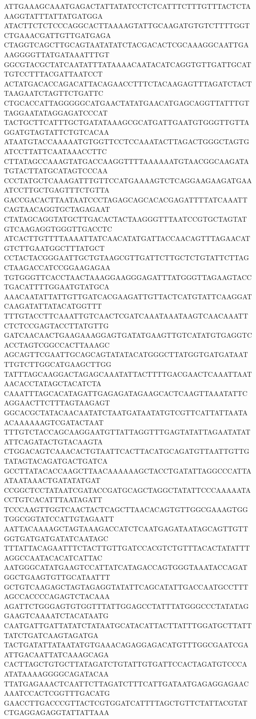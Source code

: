 ATTGAAAGCAAATGAGACTATTATATCCTCTCATTTCTTTGTTTACTCTAAAGGTATTTATTATGATGGA
ATACTTCTCTCCCAGGCACTTAAAAGTATTGCAAGATGTGTCTTTTGGTCTGAAACGATTGTTGATGAGA
CTAGGTCAGCTTGCAGTAATATATCTACGACACTCGCAAAGGCAATTGAAAGGGGTTATGATAAATTTGT
GGCGTACGCTATCAATATTTATAAAACAATACATCAGGTGTTGATTGCATTGTCCTTTACGATTAATCCT
ACTATGACACCAGACATTACAGAACCTTTCTACAAGAGTTTAGATCTACTTAAGAATCTAGTTCTGATTC
CTGCACCATTAGGGGGCATGAACTATATGAACATGAGCAGGTTATTTGTTAGGAATATAGGAGATCCCAT
TACTGCTTCATTTGCTGATATAAAGCGCATGATTGAATGTGGGTTGTTAGGATGTAGTATTCTGTCACAA
ATAATGTACCAAAAATGTGGTTCCTCCAAATACTTAGACTGGGCTAGTGATCCTTATTCAATAAACCTTC
CTTATAGCCAAAGTATGACCAAGGTTTTAAAAAATGTAACGGCAAGATATGTACTTATGCATAGTCCCAA
CCCTATGCTCAAAGATTTGTTCCATGAAAAGTCTCAGGAAGAAGATGAAATCCTTGCTGAGTTTCTGTTA
GACCGACACTTAATAATCCCTAGAGCAGCACACGAGATTTTATCAAATTCAGTAACAGGTGCTAGAGAAT
CTATAGCAGGTATGCTTGACACTACTAAGGGTTTAATCCGTGCTAGTATGTCAAGAGGTGGGTTGACCTC
ATCACTTGTTTTAAAATTATCAACATATGATTACCAACAGTTTAGAACATGTCTTGAATGGCTTTATGCT
CCTACTACGGGAATTGCTGTAAGCGTTGATTCTTGCTCTGTATTCTTAGCTAAGACCATCCGGAAGAGAA
TGTGGGTTCACCTAACTAAAGGAAGGGAGATTTATGGGTTAGAAGTACCTGACATTTTGGAATGTATGCA
AAACAATATTATTGTTGATCACGAAGATTGTTACTCATGTATTCAAGGATCAAGATATTATACATGGTTT
TTTGTACCTTCAAATTGTCAACTCGATCAAATAAATAAGTCAACAAATTCTCTCCGAGTACCTTATGTTG
GATCAACAACTGAAGAAAGGAGTGATATGAAGTTGTCATATGTGAGGTCACCTAGTCGGCCACTTAAAGC
AGCAGTTCGAATTGCAGCAGTATATACATGGGCTTATGGTGATGATAATTTGTCTTGGCATGAAGCTTGG
TATTTAGCAAGGACTAGAGCAAATATTACTTTTGACGAACTCAAATTAATAACACCTATAGCTACATCTA
CAAATTTAGCACATAGATTGAGAGATAGAAGCACTCAAGTTAAATATTCAGGAACTTCTTTAGTAAGAGT
GGCACGCTATACAACAATATCTAATGATAATATGTCGTTCATTATTAATAACAAAAAAGTCGATACTAAT
TTTGTCTACCAGCAAGGAATGTTATTAGGTTTGAGTATATTAGAATATATATTCAGATACTGTACAAGTA
CTGGACAGTCAAACACTGTAATTCACTTACATGCAGATGTTAATTGTTGTATAGTACAGATGACTGATCA
GCCTTATACACCAAGCTTAACAAAAAAGCTACCTGATATTAGGCCCATTAATAATAAACTGATATATGAT
CCGGCTCCTATAATCGATACCGATGCAGCTAGGCTATATTCCCAAAAATACCTGTCACATTTAATAGATT
TCCCAAGTTGGTCAACTACTCAGCTTAACACAGTGTTGGCGAAAGTGGTGGCGGTATCCATTGTAGAATT
AATTACAAAAGCTAGTAAAGACCATCTCAATGAGATAATAGCAGTTGTTGGTGATGATGATATCAATAGC
TTTATTACAGAATTTCTACTTGTTGATCCACGTCTGTTTACACTATATTTAGGCCAATACACATCATTAC
AATGGGCATATGAAGTCCATTATCATAGACCAGTGGGTAAATACCAGATGGCTGAAGTGTTGCATAATTT
GCTGTCAAGAGCTAGTAGAGGTATATTCAGCATATTGACCAATGCCTTTAGCCACCCCAGAGTCTACAAA
AGATTCTGGGAGTGTGGTTTATTGGAGCCTATTTATGGGCCCTATATAGGAAGTCAAAATCTACATAATG
CAATGATTGATTATATCTATAATGCATACATTACTTATTTGGATGCTTATTTATCTGATCAAGTAGATGA
TACTGATATTATAATATGTGAAACAGAGGAGACATGTTTGGCGAATCGAATTGACAATTATCAAAGCAGA
CACTTAGCTGTGCTTATAGATCTGTATTGTGATTCCACTAGATGTCCCAATATAAAAGGGGCAGATACAA
TTATGAGAAACTCAATTCTTAGATCTTTCATTGATAATGAGAGGAGAACAAATCCACTCGGTTTGACATG
GAACCTTGACCCGTTACTCGTGGATCATTTTAGCTGTTCTATTACGTATCTGAGGAGAGGTATTATTAAA
